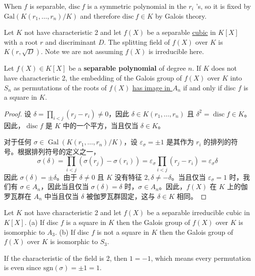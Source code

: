 When $f$ is separable, $\mathrm{disc}\ f$ is a symmetric polynomial in the $r_i$ 's, so it is fixed by $\mathrm{Gal}(K(r_1,\dots,r_n)/K)$ and therefore $\mathrm{disc }\ f\in K$ by Galois theory.

\begin{theorem}
Let $K$ not have characteristic 2 and let $f(X)$ be a separable \underline{cubic} in $K[X]$ with a root $r$ and discriminant $D$. The splitting field of $f(X)$ over $K$ is $K(r, \sqrt{D})$.
Note we are not assuming $f(X)$ is irreducible here.
\end{theorem}
\begin{theorem}[Theorem 4.23]
Let $f(X) \in K[X]$ be a \textbf{separable polynomial} of degree $n$. If $K$ does not have characteristic 2, the embedding of the Galois group of $f(X)$ over $K$ into $S_n$ as permutations of the roots of $f(X)$ \underline{has image in $A_n$} if and only if disc $f$ is a square in $K$.
\end{theorem}
\begin{proof}
设 $\delta=\prod_{i<j}\left(r_j-r_i\right) \neq 0$，因此 $\delta \in K\left(r_1, \ldots, r_n\right)$ 且 $\delta^2=\operatorname{disc} f \in K$。因此，$\operatorname{disc} f$ 是 $K$ 中的一个平方，当且仅当 $\delta \in K$。

对于任何 $\sigma \in \operatorname{Gal}\left(K\left(r_1, \ldots, r_n\right) / K\right)$，设 $\varepsilon_\sigma= \pm 1$ 是其作为 $r_i$ 的排列的符号。根据排列符号的定义之一，
\[
\sigma(\delta)=\prod_{i<j}\left(\sigma\left(r_j\right)-\sigma\left(r_i\right)\right)=\varepsilon_\sigma \prod_{i<j}\left(r_j-r_i\right)=\varepsilon_\sigma \delta
\]
因此 $\sigma(\delta)= \pm \delta$。由于 $\delta \neq 0$ 且 $K$ 没有特征 $2, \delta \neq-\delta$。当且仅当 $\varepsilon_\sigma=1$ 时，我们有 $\sigma \in A_n$，因此当且仅当 $\sigma(\delta)=\delta$ 时，$\sigma \in A_n$。因此，$f(X)$ 在 $K$ 上的伽罗瓦群在 $A_n$ 中当且仅当 $\delta$ 被伽罗瓦群固定，这与 $\delta \in K$ 相同。
\end{proof}

\begin{theorem}[Theorem 4.25]
Let $K$ not have characteristic 2 and let $f(X)$ be a separable irreducible cubic in $K[X]$.
(a) If disc $f$ is a square in $K$ then the Galois group of $f(X)$ over $K$ is isomorphic to $A_3$.
(b) If disc $f$ is not a square in $K$ then the Galois group of $f(X)$ over $K$ is isomorphic to $S_3$.\label{a1e730}
\end{theorem}

\begin{remark}
If the characteristic of the field is 2, then $1=-1$, which means every permutation is even since $\mathrm{sgn}(\sigma)=\pm1=1$.
\end{remark}
